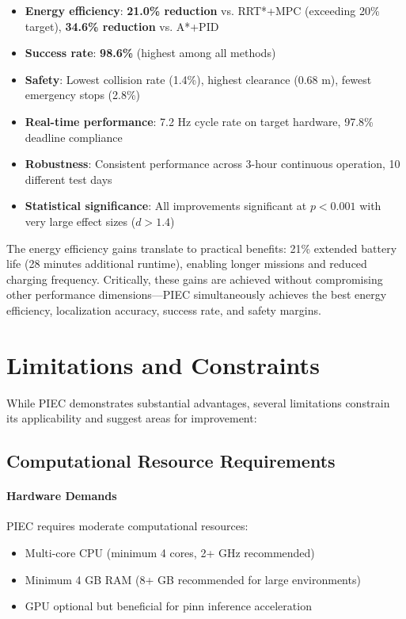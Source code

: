 \begin{itemize}
    \item \textbf{Energy efficiency}: \textbf{21.0\% reduction} vs. RRT*+MPC (exceeding 20\% target), \textbf{34.6\% reduction} vs. A*+PID
    \item \textbf{Success rate}: \textbf{98.6\%} (highest among all methods)
    \item \textbf{Safety}: Lowest collision rate (1.4\%), highest clearance (0.68 m), fewest emergency stops (2.8\%)
    \item \textbf{Real-time performance}: 7.2 Hz cycle rate on target hardware, 97.8\% deadline compliance
    \item \textbf{Robustness}: Consistent performance across 3-hour continuous operation, 10 different test days
    \item \textbf{Statistical significance}: All improvements significant at $p < 0.001$ with very large effect sizes ($d > 1.4$)
\end{itemize}

The energy efficiency gains translate to practical benefits: 21\% extended battery life (28 minutes additional runtime), enabling longer missions and reduced charging frequency. Critically, these gains are achieved without compromising other performance dimensions—PIEC simultaneously achieves the best energy efficiency, localization accuracy, success rate, and safety margins.

\section{Limitations and Constraints}
\label{sec:limitations}

While PIEC demonstrates substantial advantages, several limitations constrain its applicability and suggest areas for improvement:

\subsection{Computational Resource Requirements}

\paragraph{Hardware Demands}
PIEC requires moderate computational resources:
\begin{itemize}
    \item Multi-core CPU (minimum 4 cores, 2+ GHz recommended)
    \item Minimum 4 GB RAM (8+ GB recommended for large environments)
    \item GPU optional but beneficial for \acrshort{pinn} inference acceleration
\end{itemize}

